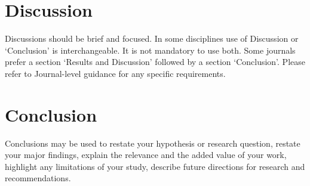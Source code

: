 \documentclass[sn-apa]{sn-jnl}%
\theoremstyle{thmstyleone}%
\theoremstyle{thmstyletwo}%
\theoremstyle{thmstylethree}%
\begin{document}




\section{Discussion}\label{sec12}

Discussions should be brief and focused. In some disciplines use of Discussion or `Conclusion' is interchangeable. It is not mandatory to use both. Some journals prefer a section `Results and Discussion' followed by a section `Conclusion'. Please refer to Journal-level guidance for any specific requirements. 

\section{Conclusion}\label{sec13}

Conclusions may be used to restate your hypothesis or research question, restate your major findings, explain the relevance and the added value of your work, highlight any limitations of your study, describe future directions for research and recommendations. 
\end{document}
